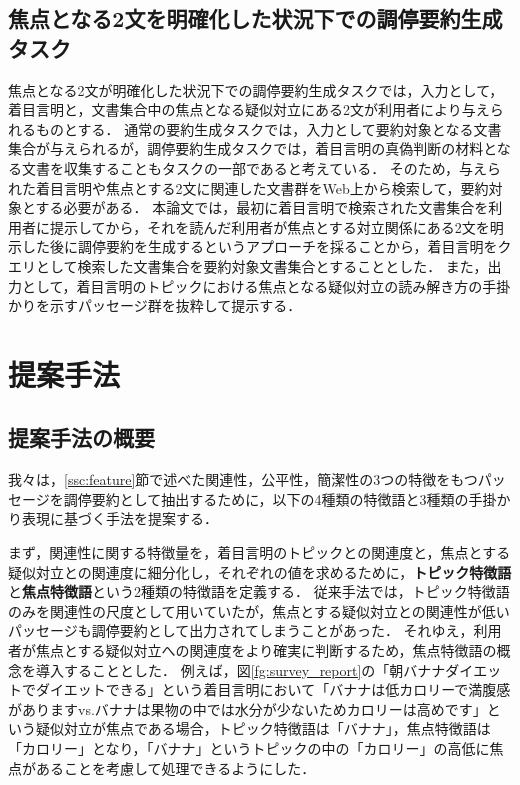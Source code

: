 \documentclass[japanese]{jnlp_1.4}
\begin{document}
\subsection{焦点となる2文を明確化した状況下での調停要約生成タスク}

焦点となる2文が明確化した状況下での調停要約生成タスクでは，入力として，着目言明と，文書集合中の焦点となる疑似対立にある2文が利用者により与えられるものとする．
通常の要約生成タスクでは，入力として要約対象となる文書集合が与えられるが，調停要約生成タスクでは，着目言明の真偽判断の材料となる文書を収集することもタスクの一部であると考えている．
そのため，与えられた着目言明や焦点とする2文に関連した文書群をWeb上から検索して，要約対象とする必要がある．
本論文では，最初に着目言明で検索された文書集合を利用者に提示してから，それを読んだ利用者が焦点とする対立関係にある2文を明示した後に調停要約を生成するというアプローチを採ることから，着目言明をクエリとして検索した文書集合を要約対象文書集合とすることとした．
また，出力として，着目言明のトピックにおける焦点となる疑似対立の読み解き方の手掛かりを示すパッセージ群を抜粋して提示する．


\section{提案手法}
\label{sc:proposedmethod}

\subsection{提案手法の概要}
\label{ssc:outline}

我々は，\ref{ssc:feature}節で述べた関連性，公平性，簡潔性の3つの特徴をもつパッセージを調停要約として抽出するために，以下の4種類の特徴語と3種類の手掛かり表現に基づく手法を提案する．

まず，関連性に関する特徴量を，着目言明のトピックとの関連度と，焦点とする疑似対立との関連度に細分化し，それぞれの値を求めるために，{\bf トピック特徴語}と{\bf 焦点特徴語}という2種類の特徴語を定義する．
従来手法\cite{Shibuki2011a,Nakano2011,Shibuki2010}では，トピック特徴語のみを関連性の尺度として用いていたが，焦点とする疑似対立との関連性が低いパッセージも調停要約として出力されてしまうことがあった．
それゆえ，利用者が焦点とする疑似対立への関連度をより確実に判断するため，焦点特徴語の概念を導入することとした．
例えば，図\ref{fg:survey_report}の「朝バナナダイエットでダイエットできる」という着目言明において「バナナは低カロリーで満腹感がありますvs.バナナは果物の中では水分が少ないためカロリーは高めです」という疑似対立が焦点である場合，トピック特徴語は「バナナ」，焦点特徴語は「カロリー」となり，「バナナ」というトピックの中の「カロリー」の高低に焦点があることを考慮して処理できるようにした．
\end{document}
